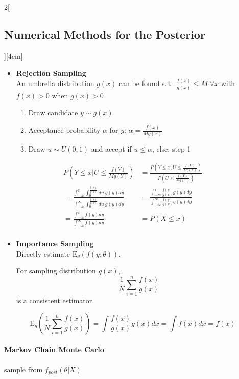 \documentclass[8pt]{extarticle}
\begin{document}
\begin{multicols}{2}[\subsection{Numerical Methods for the Posterior}][4cm]
\begin{itemize}
\item \textbf{Rejection Sampling} \\
An umbrella distribution $g(x)$ can be found s.\,t.\ $\frac{f(x)}{g(x)} \leq M \;\forall x$ with $f(x)>0$ when $g(x)>0$ 
\vspace{-0.5em}
\begin{enumerate}
\item Draw candidate $y\sim g(x)$
\item Acceptance probability $\alpha$ for $y$: $\alpha = \frac{f(x)}{Mg(x)}$
\item Draw $u \sim U(0,1)$ and accept if $u\leq\alpha$, else: step 1
\end{enumerate}
\end{itemize}
\begin{Proof}
\vspace{-1.3em}
\begin{align*}
P\left(Y\leq x|U\leq\frac{f(Y)}{Mg(Y)}\right) 
&= \frac{P\left(Y\leq x, U\leq\frac{f(Y)}{Mg(Y)}\right)}{P\left(U\leq\frac{f(Y)}{Mg(Y)}\right)}\\
=\frac{\int_{-\infty}^x \int_0^{\frac{f(y)}{g(x)}} du\: g(y) dy}{\int_{-\infty}^\infty \int_0^{\frac{f(y)}{g(x)}} du\: g(y) dy} 
&= \frac{\int_{-\infty}^x \frac{f(y)}{g(x)} g(y) dy}{\int_{-\infty}^\infty \frac{f(y)}{g(x)} g(y) dy}\\
= \frac{\int_{-\infty}^x f(y) dy}{\int_{-\infty}^\infty f(y) dy} &= P(X\leq x)\\
\end{align*}
\end{Proof}

\begin{itemize}
\item \textbf{Importance Sampling} \\
Directly estimate $\mathrm{E}_\theta(f(y;\theta))$.

For sampling distribution $g(x)$,
$$\frac{1}{N}\sum_{i=1}^n \frac{f(x)}{g(x)}$$
is a consistent estimator.
\end{itemize}
\begin{Proof}
\vspace{-1em}
$$\mathrm{E}_g\left(\frac{1}{N}\sum_{i=1}^n \frac{f(x)}{g(x)}\right) = \int \frac{f(x)}{g(x)}g(x)dx = \int f(x) dx = f(x)$$
\end{Proof}



\paragraph{Markov Chain Monte Carlo} sample from $f_{post}(\theta|X)$


\end{multicols}
\end{document}
